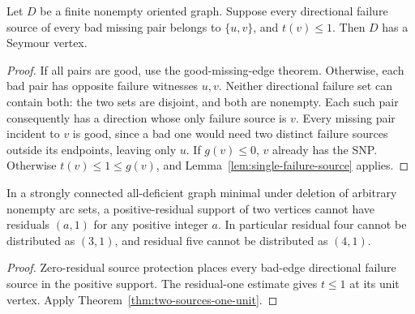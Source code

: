 \begin{theorem}
\label{thm:two-sources-one-unit}
Let $D$ be a finite nonempty oriented graph. Suppose every directional
failure source of every bad missing pair belongs to $\{u,v\}$,
and $t(v)\le1$. Then $D$ has a Seymour vertex.
\end{theorem}
\begin{proof}
If all pairs are good, use the good-missing-edge theorem. Otherwise,
each bad pair has opposite failure witnesses $u,v$. Neither directional
failure set can contain both: the two sets are disjoint, and both
are nonempty. Each such pair consequently has a direction whose
only failure source is $v$.
Every missing pair incident to $v$ is good, since a bad one would
need two distinct failure sources outside its endpoints, leaving
only $u$. If $g(v)\le0$, $v$ already has the SNP. Otherwise
$t(v)\le1\le g(v)$, and Lemma~\ref{lem:single-failure-source} applies.
\end{proof}

\begin{corollary}
\label{cor:no-two-source-unit}
In a strongly connected all-deficient graph minimal under deletion of
arbitrary nonempty arc sets, a positive-residual support of two vertices
cannot have residuals $(a,1)$ for any positive integer $a$.
In particular residual four cannot be distributed as $(3,1)$, and
residual five cannot be distributed as $(4,1)$.
\end{corollary}
\begin{proof}
Zero-residual source protection places every bad-edge directional
failure source in the positive support. The residual-one estimate
gives $t\le1$ at its unit vertex. Apply
Theorem~\ref{thm:two-sources-one-unit}.
\end{proof}
